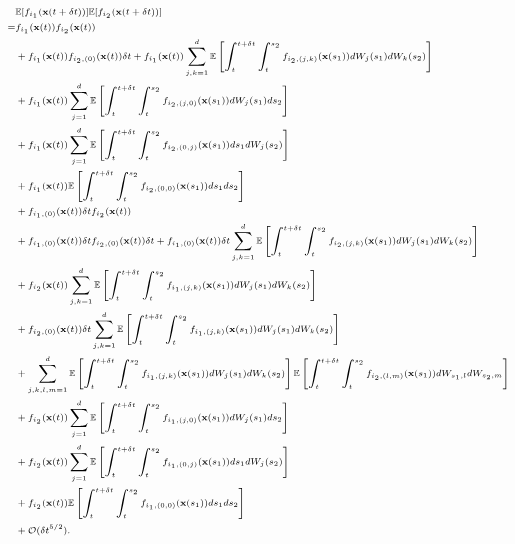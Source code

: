\begin{equation} \label{eq:E1E2}
\scriptsize
\begin{aligned}
&\mathbb{E} [f_{i_1}(\mathbf{x}(t+\delta t))] \mathbb{E} [f_{i_2}(\mathbf{x}(t+\delta t))] \\
=&
f_{i_1}(\mathbf{x}(t)) f_{i_2}(\mathbf{x}(t)) \\
&+  f_{i_1}(\mathbf{x}(t))f_{{i_2},(0)}(\mathbf{x}(t)) \delta t
+ f_{i_1}(\mathbf{x}(t))\sum_{j, k=1}^d \mathbb{E} \left[ \int_t^{t+\delta t} \int_t^{s_2} f_{{i_2},(j,k)}(\mathbf{x}(s_1)) dW_j(s_1) dW_k(s_2) \right] \\
&+ f_{i_1}(\mathbf{x}(t))\sum_{j=1}^d \mathbb{E} \left[ \int_t^{t+\delta t} \int_t^{s_2} f_{{i_2},(j,0)}(\mathbf{x}(s_1)) dW_j(s_1) ds_2  \right]\\
&+ f_{i_1}(\mathbf{x}(t)) \sum_{j=1}^d \mathbb{E} \left[ \int_t^{t+\delta t} \int_t^{s_2} f_{{i_2},(0,j)}(\mathbf{x}(s_1)) ds_1 dW_j(s_2) \right] \\
&+ f_{i_1}(\mathbf{x}(t)) \mathbb{E} \left[ \int_t^{t+\delta t} \int_t^{s_2} f_{{i_2},(0,0)}(\mathbf{x}(s_1)) ds_1 ds_2  \right]\\
&+ f_{{i_1},(0)}(\mathbf{x}(t)) \delta t f_{i_2}(\mathbf{x}(t)) \\
&+ f_{{i_1},(0)}(\mathbf{x}(t)) \delta t f_{{i_2},(0)}(\mathbf{x}(t)) \delta t
+ f_{{i_1},(0)}(\mathbf{x}(t)) \delta t \sum_{j, k=1}^d \mathbb{E} \left[ \int_t^{t+\delta t} \int_t^{s_2} f_{{i_2},(j,k)}(\mathbf{x}(s_1)) dW_j(s_1) dW_k(s_2) \right] \\
&+ f_{i_2}(\mathbf{x}(t)) \sum_{j, k=1}^d \mathbb{E} \left[ \int_t^{t+\delta t} \int_t^{s_2} f_{{i_1},(j,k)}(\mathbf{x}(s_1)) dW_j(s_1) dW_k(s_2) \right] \\
&+ f_{{i_2},(0)}(\mathbf{x}(t)) \delta t \sum_{j, k=1}^d \mathbb{E} \left[ \int_t^{t+\delta t} \int_t^{s_2} f_{{i_1},(j,k)}(\mathbf{x}(s_1)) dW_j(s_1) dW_k(s_2) \right] \\
&+ \sum_{j, k, l, m =1}^d \mathbb{E} \left[ \int_t^{t+\delta t} \int_t^{s_2} f_{{i_1},(j,k)}(\mathbf{x}(s_1)) dW_j(s_1) dW_k(s_2) \right] \mathbb{E} \left[ \int_t^{t+\delta t} \int_t^{s_2} f_{{i_2},(l,m)}(\mathbf{x}(s_1)) dW_{s_1, l} dW_{s_2, m} \right] \\
&+ f_{i_2}(\mathbf{x}(t)) \sum_{j=1}^d \mathbb{E} \left[ \int_t^{t+\delta t} \int_t^{s_2} f_{{i_1},(j,0)}(\mathbf{x}(s_1)) dW_j(s_1) ds_2  \right]  \\
&+ f_{i_2}(\mathbf{x}(t)) \sum_{j=1}^d \mathbb{E} \left[  \int_t^{t+\delta t} \int_t^{s_2} f_{{i_1},(0,j)}(\mathbf{x}(s_1)) ds_1 dW_j(s_2) \right] \\
&+ f_{i_2}(\mathbf{x}(t) )\mathbb{E} \left[ \int_t^{t+\delta t} \int_t^{s_2} f_{{i_1},(0,0)}(\mathbf{x}(s_1)) ds_1 ds_2  \right]\\
&+ \mathcal{O}(\delta t^{5/2}) .
\end{aligned}
\end{equation}
